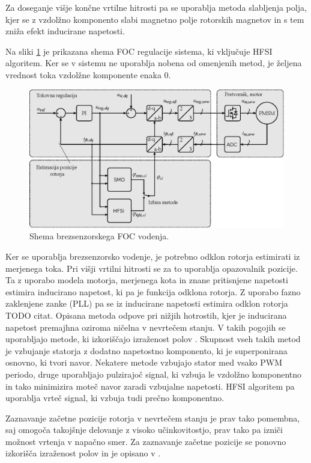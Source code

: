 \documentclass[a4paper,twoside,openright,12pt,slovene]{book}
\begin{document}
Za doseganje višje končne vrtilne hitrosti pa se uporablja metoda slabljenja polja, kjer se z vzdolžno komponento slabi magnetno polje rotorskih magnetov in s tem zniža efekt inducirane
napetosti\cite{ambrovzivc2016elektrivcni}.

Na sliki \ref{FOCshema} je prikazana shema FOC regulacije sistema, ki vključuje HFSI algoritem. Ker se v sistemu ne uporablja nobena od omenjenih metod, je željena vrednost toka vzdolžne komponente enaka 0.

\begin{figure}[!htbp]
    \centering
    \includegraphics[width=0.75\columnwidth]{Slike/Inkscape/FOC.eps}
    \caption{\label{FOCshema} Shema brezsenzorskega FOC vodenja.}
\end{figure}

Ker se uporablja brezsenzorsko vodenje, je potrebno odklon rotorja estimirati iz merjenega toka. Pri višji vrtilni hitrosti se za to uporablja opazovalnik pozicije. Ta z uporabo modela motorja, merjenega
kota in znane pritisnjene napetosti estimira inducirano napetost, ki pa je funkcija odklona rotorja. Z uporabo fazno zaklenjene zanke (PLL) pa se iz inducirane napetosti estimira odklon rotorja TODO
citat.
Opisana metoda odpove pri nižjih hotrostih, kjer je inducirana napetost premajhna oziroma ničelna v nevrtečem stanju. V takih pogojih se uporabljajo metode, ki izkoriščajo izraženost polov \cite{ThreeYearsOfExperience}. Skupnost
vseh takih metod je vzbujanje statorja z dodatno napetostno komponento, ki je superponirana osnovno, ki tvori navor. Nekatere metode vzbujajo stator med vsako PWM periodo, druge uporabljajo pulzirajoč
signal, ki vzbuja le vzdolžno komponentno in tako minimizira moteč navor zaradi vzbujalne napetosti. HFSI algoritem pa uporablja vrteč signal, ki vzbuja tudi prečno komponentno. 

Zaznavanje začetne pozicije rotorja v nevrtečem stanju je prav tako pomembna, saj omogoča takojšnje delovanje z visoko učinkovitostjo, prav tako pa izniči možnost vrtenja v napačno smer. Za zaznavanje
začetne pozicije se ponovno izkorišča izraženost polov in je opisano v \cite{IPDBoussak}.
\end{document}
